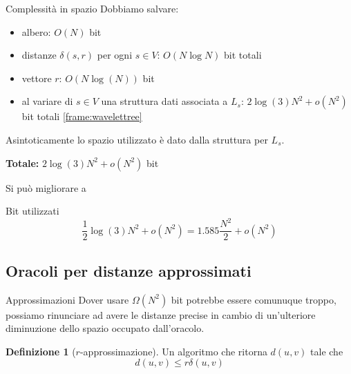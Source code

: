 \documentclass{beamer}
\newcounter{counter1}
\theoremstyle{plain}
\theoremstyle{definition}
\newtheorem{mydef}[counter1]{Definizione}
\theoremstyle{remark}
\newcommand{\pa}[1]{\left(#1\right)}
\begin{document}
\begin{frame}{Complessità in spazio}
  Dobbiamo salvare:
  \begin{itemize}
  \item albero: $O\pa{N}$ bit
  \item distanze $\delta\pa{s,r}$ per ogni $s\in V$: $O\pa{ N \log N}$
    bit totali
  \item vettore $r$: $O\pa{N \log\pa{N}}$ bit 
  \item al variare di $s\in V$ una struttura dati associata a $L_s$:
    $2\log\pa{3} N^2 + o(N^2)$ bit totali {\color{white}
      \ref{frame:wavelettree}}
  \end{itemize}
  Asintoticamente lo spazio utilizzato è dato dalla struttura per
  $L_s$.

  \textbf{Totale:} ${2}\log\pa{3} N^2 + o(N^2)$ bit \vfill
  \pause

  Si pu\`o migliorare a 
  \begin{block}{Bit utilizzati}
    \[ \frac{1}{2}\log\pa{3} N^2 + o\pa{N^2} = 1.585 \frac{N^2}{2} +
    o\pa{N^2} \]
  \end{block}
\end{frame}


\subsection*{Oracoli per distanze approssimati}
\label{sec:approx}

\begin{frame}{Approssimazioni}
  Dover usare $\Omega \pa{N^2}$ bit potrebbe essere comunuque troppo,
  possiamo rinunciare ad avere le distanze precise in cambio di
  un'ulteriore diminuzione dello spazio occupato dall'oracolo.
  \vfill
  
  \begin{mydef}[$r$-approssimazione]
    Un algoritmo che ritorna $d(u,v)$ tale che
    \[ d\pa{u,v} \le r \delta\pa{u,v} \]
  \end{mydef}
\end{frame}
\end{document}
